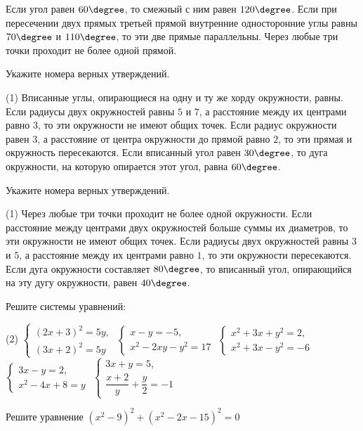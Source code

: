 \begin{class}[number=1]
\begin{listofex}
\begin{tasks}
		\task Если угол равен \( 60\degree \), то смежный с ним равен \( 120\degree \).
		\task Если при пересечении двух прямых третьей прямой внутренние односторонние углы равны \( 70\degree \) и \( 110\degree \), то эти две прямые параллельны.
		\task Через любые три точки проходит не более одной прямой.
	\end{tasks}
	\item Укажите номера верных утверждений.
	\begin{tasks}(1)
		\task Вписанные углы, опирающиеся на одну и ту же хорду окружности, равны.
		\task Если радиусы двух окружностей равны \( 5 \) и \( 7 \), а расстояние между их центрами равно \( 3 \), то эти окружности не имеют общих точек.
		\task Если радиус окружности равен \( 3 \), а расстояние от центра окружности до прямой равно \( 2 \), то эти прямая и окружность пересекаются.
		\task Если вписанный угол равен \( 30\degree \), то дуга окружности, на которую опирается этот угол, равна \( 60\degree \).
	\end{tasks}
	\item Укажите номера верных утверждений.
	\begin{tasks}(1)
		\task Через любые три точки проходит не более одной окружности.
		\task Если расстояние между центрами двух окружностей больше суммы их диаметров, то эти окружности не имеют общих точек.
		\task Если радиусы двух окружностей равны \( 3 \) и \( 5 \), а расстояние между их центрами равно \( 1 \), то эти окружности пересекаются.
		\task Если дуга окружности составляет \( 80\degree \), то вписанный угол, опирающийся на эту дугу окружности, равен \( 40\degree \).
	\end{tasks}
	\item Решите системы уравнений:
	\begin{tasks}(2)
		\task \( \begin{cases}
			(2x+3)^2=5y,\\
			(3x+2)^2=5y
		\end{cases} \)
		\task \( \begin{cases}
			x-y=-5,\\
			x^2-2xy-y^2=17
		\end{cases} \)
		\task \( \begin{cases}
			x^2+3x+y^2=2,\\
			x^2+3x-y^2=-6
		\end{cases} \)
		\task \( \begin{cases}
			3x-y=2,\\
			x^2-4x+8=y
		\end{cases} \)
		\task \( \begin{cases}
			3x+y=5,\\
			\dfrac{x+2}{y}+\dfrac{y}{2}=-1
		\end{cases} \)
	\end{tasks}
	\item Решите уравнение \( (x^2-9)^2+(x^2-2x-15)^2=0 \)
	\end{listofex}
\end{class}

